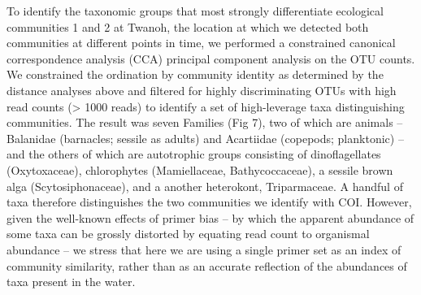 \documentclass[fleqn,10pt,lineno]{wlpeerj} %
\begin{document}
To identify the taxonomic groups that most strongly differentiate
ecological communities 1 and 2 at Twanoh, the location at which we
detected both communities at different points in time, we performed a
constrained canonical correspondence analysis (CCA) principal component
analysis on the OTU counts. We constrained the ordination by community
identity as determined by the distance analyses above and filtered for
highly discriminating OTUs with high read counts (\textgreater{} 1000
reads) to identify a set of high-leverage taxa distinguishing
communities. The result was seven Families (Fig 7), two of which are
animals -- Balanidae (barnacles; sessile as adults) and Acartiidae
(copepods; planktonic) -- and the others of which are autotrophic groups
consisting of dinoflagellates (Oxytoxaceae), chlorophytes (Mamiellaceae,
Bathycoccaceae), a sessile brown alga (Scytosiphonaceae), and a another
heterokont, Triparmaceae. A handful of taxa therefore distinguishes the
two communities we identify with COI. However, given the well-known
effects of primer bias -- by which the apparent abundance of some taxa
can be grossly distorted by equating read count to organismal abundance
-- we stress that here we are using a single primer set as an index of
community similarity, rather than as an accurate reflection of the
abundances of taxa present in the water.
\end{document}
